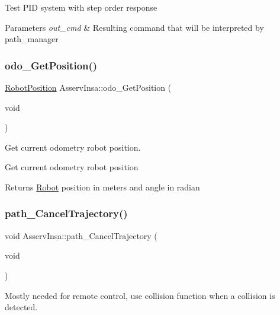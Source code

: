 Test P\+ID system with step order response 
\begin{DoxyParams}{Parameters}
{\em out\+\_\+cmd} & Resulting command that will be interpreted by path\+\_\+manager \\
\hline
\end{DoxyParams}
\mbox{\label{classAsservInsa_ad3ba1c750cbefac429d6901b579a61a8}} 
\subsubsection{\texorpdfstring{odo\+\_\+\+Get\+Position()}{odo\_GetPosition()}}
{\footnotesize\ttfamily \hyperlink{structRobotPosition}{Robot\+Position} Asserv\+Insa\+::odo\+\_\+\+Get\+Position (\begin{DoxyParamCaption}\item[{void}]{ }\end{DoxyParamCaption})}



Get current odometry robot position. 

Get current odometry robot position

\begin{DoxyReturn}{Returns}
\hyperlink{classRobot}{Robot} position in meters and angle in radian 
\end{DoxyReturn}
\mbox{\label{classAsservInsa_a81c2ebb47e4d076df72b46dda9798828}} 
\subsubsection{\texorpdfstring{path\+\_\+\+Cancel\+Trajectory()}{path\_CancelTrajectory()}}
{\footnotesize\ttfamily void Asserv\+Insa\+::path\+\_\+\+Cancel\+Trajectory (\begin{DoxyParamCaption}\item[{void}]{ }\end{DoxyParamCaption})}

Mostly needed for remote control, use collision function when a collision is detected. \mbox{\label{classAsservInsa_aef3d84dbdf3cf625978f25554202369e}} 
